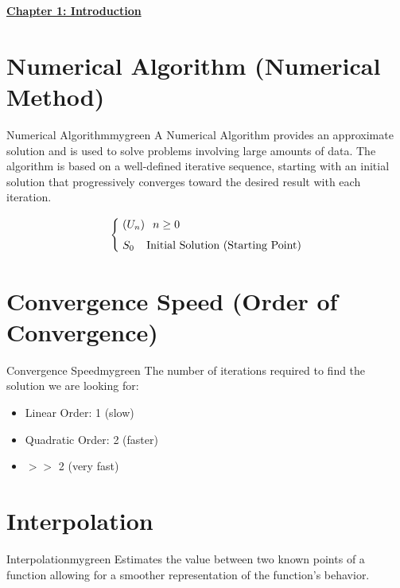 \begin{center}
    \Huge{\textbf{\underline{Chapter 1: Introduction}}}
\end{center}

\vspace{0.35cm}


\section{Numerical Algorithm (Numerical Method)}
\begin{prettyBox}{Numerical Algorithm}{mygreen}
A Numerical Algorithm provides an approximate solution and is used to solve problems involving large amounts of data. The algorithm is based on a well-defined iterative sequence, starting with an initial solution that progressively converges toward the desired result with each iteration.

\[
\begin{cases}
    \hspace{0.1cm}(U_n) & \hspace{-0.1cm}n \geq 0 \\[0.15cm]
    \hspace{0.1cm}S_0 & \hspace{-0.3cm} \text{Initial Solution (Starting Point)}
\end{cases}
\]
\end{prettyBox}
\vspace{0.35cm}

\section{Convergence Speed (Order of Convergence)}
\begin{prettyBox}{Convergence Speed}{mygreen}
The number of iterations required to find the solution we are looking for:
\begin{itemize}
    \item Linear Order: 1 (slow)
    \item Quadratic Order: 2 (faster)
    \item \(>>\) 2 (very fast)
\end{itemize}
\end{prettyBox}

\vspace{0.35cm}

\section{Interpolation}
\begin{prettyBox}{Interpolation}{mygreen}
Estimates the value between two known points of a function allowing for a smoother representation of the function's behavior.
\end{prettyBox}

